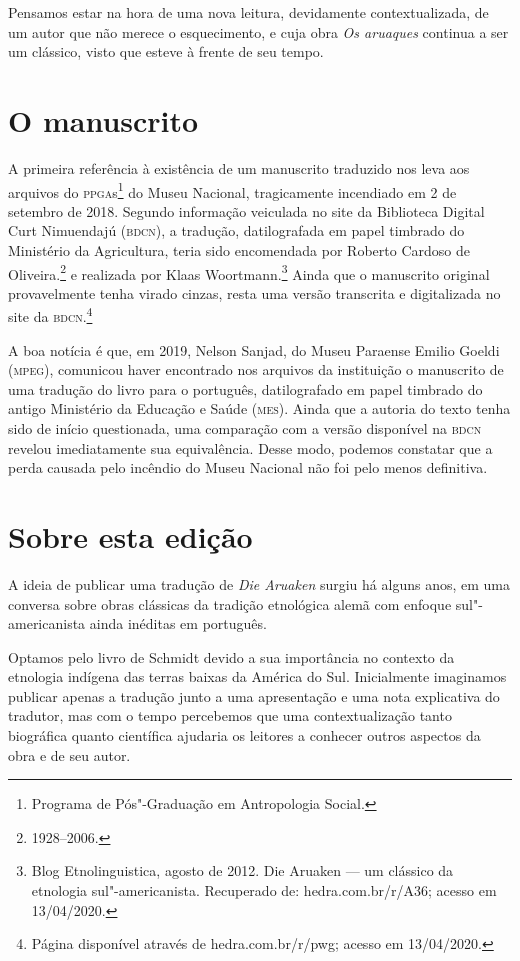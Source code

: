 Pensamos estar na hora de uma nova leitura, devidamente contextualizada, de um autor que não merece o esquecimento, e cuja obra \textit{Os aruaques} continua a ser um clássico, visto que esteve à frente de seu tempo.

\section{O manuscrito}

A primeira referência à existência de um manuscrito traduzido nos leva aos arquivos do \textsc{ppga}s\footnote{Programa de Pós"-Graduação em Antropologia Social.} do Museu Nacional, 
tragicamente incendiado em 2 de setembro de 2018. Segundo informação veiculada no site da Biblioteca Digital Curt Nimuendajú (\textsc{bdcn}), a tradução, datilografada em papel timbrado do Ministério da Agricultura, teria sido encomendada por Roberto Cardoso de Oliveira.\footnote{1928--2006.} e realizada por Klaas Woortmann.\footnote{Blog Etnolinguistica, agosto de 2012. Die Aruaken --- um clássico da etnologia sul"-americanista. Recuperado de: hedra.com.br/r/A36; acesso em 13/04/2020.} Ainda que o manuscrito original provavelmente tenha virado cinzas, resta uma versão transcrita e digitalizada no site da \textsc{bdcn}.\footnote{Página disponível através de hedra.com.br/r/pwg; acesso em 13/04/2020.} 

A boa notícia é que, em 2019, Nelson Sanjad, do Museu Paraense Emilio Goeldi (\textsc{mpeg}), comunicou haver encontrado nos arquivos da instituição o manuscrito de uma tradução do livro para o português, datilografado em papel timbrado do antigo Ministério da Educação e Saúde (\textsc{mes}). Ainda que a autoria do texto tenha sido de início questionada, uma comparação com a versão disponível na \textsc{bdcn} revelou imediatamente sua equivalência. Desse modo, podemos constatar que a perda causada pelo incêndio do Museu Nacional não foi pelo menos definitiva.

\section{Sobre esta edição}

A ideia de publicar uma tradução de \textit{Die Aruaken} surgiu há alguns anos, em uma conversa sobre obras clássicas da tradição etnológica alemã com enfoque sul"-americanista ainda inéditas em português. 

Optamos pelo livro de Schmidt devido a sua importância no contexto da etnologia indígena das terras baixas da América do Sul. Inicialmente imaginamos publicar apenas a tradução junto a uma apresentação e uma nota explicativa do tradutor, mas com o tempo percebemos que uma contextualização tanto biográfica quanto científica ajudaria os leitores a conhecer outros aspectos da obra e de seu autor.

